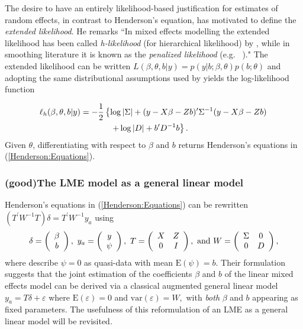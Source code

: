 \documentclass[12pt, a4paper]{report}
\theoremstyle{plain}
\theoremstyle{definition}
\theoremstyle{remark}
\begin{document}
			The desire to have an entirely likelihood-based justification for estimates of random effects, in contrast to Henderson's equation, has motivated \citet[page 429]{Pawi:in:2001} to define the \emph{extended likelihood}. He remarks ``In mixed effects modelling the extended likelihood has been called \emph{h-likelihood} (for hierarchical  likelihood) by \cite{Lee:Neld:hier:1996}, while in smoothing literature it is known as the \emph{penalized likelihood} (e.g.\ \citeauthor{Gree:Silv:nonp:1994} \citeyear{Gree:Silv:nonp:1994})." The extended likelihood can be written $L(\beta,\theta,b|y) = p(y|b;\beta,\theta) p(b;\theta)$ and adopting the same distributional assumptions used by \cite{Henderson:1950} yields the log-likelihood function
			
			\begin{eqnarray*}
				\ell_h(\beta,\theta,b|y)
				& = \displaystyle -\frac{1}{2} \left\{ \log|\Sigma| + (y - X \beta -Zb)'\Sigma^{-1}( y - X \beta -Zb) \right.\\
				&  \hspace{0.5in} \left. + \log|D| + b^\prime D^{-1}b \right\}.
			\end{eqnarray*}
			Given $\theta$, differentiating with respect to $\beta$ and $b$ returns Henderson's equations in (\ref{Henderson:Equations}).
			
			\subsubsection{ (good)The LME model as a general linear model}
			Henderson's equations in (\ref{Henderson:Equations}) can be rewritten $( T^\prime W^{-1} T ) \delta = T^\prime W^{-1} y_{a} $ using
			\[
			\delta = \left(\begin{array}{c}\beta \\ b \end{array}\right),
			\ y_{a} = \left(\begin{array}{c}
			y \cr \psi
			\end{array}\right),
			\ T = \left(\begin{array}{cc}
			X & Z  \\
			0 & I
			\end{array}\right),
			\ \textrm{and} \ W = \left(\begin{array}{cc}
			\Sigma & 0  \cr
			0 &  D \end{array}\right),
			\]
			where \cite{YLee2006} describe $\psi = 0$ as quasi-data with mean $\mathrm{E}(\psi) = b.$ Their formulation suggests that the joint estimation of the coefficients $\beta$ and $b$ of the linear mixed effects model can be derived via a classical augmented general linear model $y_{a} = T\delta + \varepsilon$ where $\mathrm{E}(\varepsilon) = 0$ and $\mathrm{var}(\varepsilon) = W,$ with \emph{both} $\beta$ and $b$ appearing as fixed parameters. The usefulness of this reformulation of an LME as a general linear model will be revisited.
			
\end{document}
